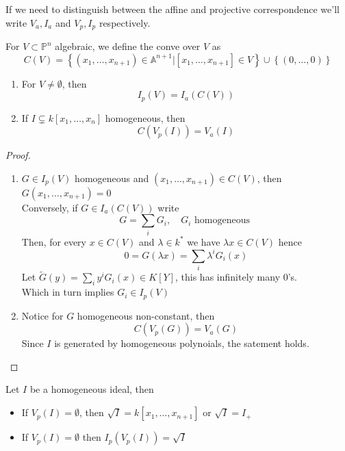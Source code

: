 \documentclass[../main.tex]{subfiles}
\begin{document}
\begin{rmq}
If we need to distinguish between the affine and projective correspondence we'll write $V_a,I_a$ and $V_p,I_p$ respectively.
\end{rmq}
\begin{defn}[Cone]
For $V \subset  \mathbb{P}^{n}$ algebraic, we define the conve over $V$ as
\[ 
C( V) = \left\{ ( x_1,\ldots,x_{n+1} ) \in \mathbb{A}^{n+1}| [ x_1,\ldots,x_{n+1} ] \in V \right\} \cup \left\{ ( 0,\ldots,0)  \right\} 
\]
	
\end{defn}
\begin{lemma}
\begin{enumerate}
\item For $V \neq \emptyset$, then
	\[ 
	I_p( V) = I_a( C( V) ) 
\]
\item If $ I \subsetneq k[x_1,\ldots,x_n]$ homogeneous, then
	\[ 
	C( V_p( I) ) = V_a( I) 
	\]
	
\end{enumerate}
\end{lemma}
\begin{proof}
\begin{enumerate}
\item $G\in I_p( V) $ homogeneous and $ ( x_1,\ldots,x_{n+1} ) \in C( V) $, then $G( x_1,\ldots,x_{n+1} ) =0$ \\
	Conversely, if $G\in I_a( C( V) ) $ write
	\[ 
	G= \sum_i G_i,\quad G_i \text{ homogeneous } 
	\]
	Then, for every $x\in C( V) $ and $\lambda\in k^{*}$ we have $ \lambda x \in C( V) $ hence
	\[ 
	0 = G( \lambda x ) = \sum_i \lambda^{i}G_i( x) 
	\]
	Let $\tilde G ( y) = \sum_{i}^{ } y^{i}G_i( x) \in K[Y]$, this has infinitely many $0$'s.\\
	Which in turn implies $G_i \in I_p( V) $ 
	

\item Notice for $G$ homogeneous non-constant, then
	\[ 
	C( V_p( G) ) = V_a( G) 
	\]
	Since $I$ is generated by homogeneous polynoials, the satement holds.
\end{enumerate}

\end{proof}
\begin{propo}
Let $I$ be a homogeneous ideal, then
\begin{itemize}
	\item If $ V_p( I) = \emptyset$, then $ \sqrt{I} = k[x_1,\ldots,x_{n+1} ]$ or $ \sqrt{I} = I_+$ 
	\item If $V_p( I) = \emptyset$ then $I_p( V_p( I) ) = \sqrt{I} $ 
\end{itemize}

\end{propo}
\end{document}
